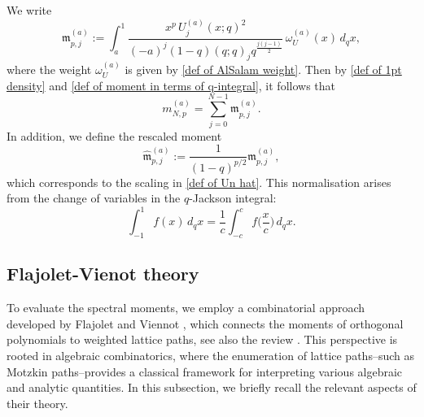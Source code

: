 \documentclass{amsart}
\theoremstyle{plain}
\theoremstyle{remark}
\numberwithin{equation}{section}
\begin{document}
We write 
\begin{equation}  
\mathfrak{m}_{p,j}^{(a)}:= \int_a^1 \frac{ x^p \, U_{j}^{(a)}(x;q)^2  }{ (-a)^{j}(1-q)(q;q)_{j} q^{\frac{j(j-1)}{2}} }  \,\omega_U^{(a)}(x) \,d_qx,
\end{equation}
where the weight $\omega_U^{(a)}$ is given by \eqref{def of AlSalam weight}.
Then by \eqref{def of 1pt density} and \eqref{def of moment in terms of q-integral}, it follows that 
\begin{equation} \label{m pj as a sum of mathfrak m}
m_{N,p}^{ (a) } =  \sum_{j=0}^{N-1} \mathfrak{m}_{p,j}^{(a)}. 
\end{equation}
In addition, we define the rescaled moment
\begin{equation} \label{def of mathfrak m pj hat}
\widehat{\mathfrak{m}}_{p,j}^{(a)} := \frac{1}{(1-q)^{p/2}} \mathfrak{m}_{p,j}^{(a)},
\end{equation}
which corresponds to the scaling in \eqref{def of Un hat}. This normalisation arises from the change of variables in the $q$-Jackson integral:
\begin{equation}\label{1.43}
\int_{-1}^1 f(x) \,d_q x = \frac{1}{c} \int_{-c}^c f\Big( \frac{x}{c} \Big) \, d_q x.
\end{equation} 

















































\subsection{Flajolet-Vienot theory}

To evaluate the spectral moments, we employ a combinatorial approach developed by Flajolet and Viennot \cite{Fl80, Vi00}, which connects the moments of orthogonal polynomials to weighted lattice paths, see also the review \cite{CKS16}.  
This perspective is rooted in algebraic combinatorics, where the enumeration of lattice paths--such as Motzkin paths--provides a classical framework for interpreting various algebraic and analytic quantities.  
In this subsection, we briefly recall the relevant aspects of their theory.
\end{document}
